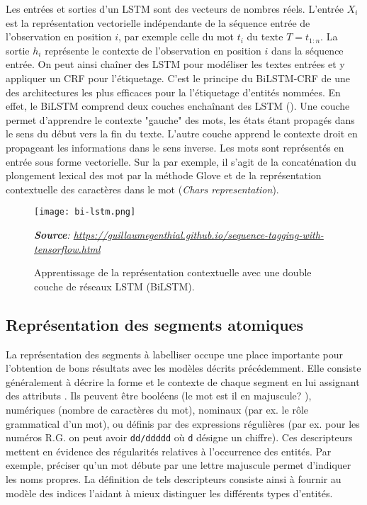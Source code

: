 Les entrées et sorties d'un LSTM sont des vecteurs de nombres réels. L'entrée $X_i$ est la représentation vectorielle indépendante de la séquence entrée de l'observation en position $i$, par exemple celle du mot $t_i$ du texte $T=t_{1:n}$. La sortie $h_i$ représente le contexte de l'observation en position $i$ dans la séquence entrée. On peut ainsi chaîner des LSTM pour modéliser les textes entrées et y appliquer un CRF pour l'étiquetage. C'est le principe du BiLSTM-CRF de \citet{lample2016nnner} une des architectures les plus efficaces pour la l'étiquetage d'entités nommées. En effet, le BiLSTM comprend deux couches enchaînant des LSTM (). Une couche permet d'apprendre le contexte "gauche" des mots, les états étant propagés dans le sens du début vers la fin du texte. L'autre couche apprend le contexte droit en propageant les informations dans le sens inverse. Les mots sont représentés en entrée sous forme vectorielle. Sur la  par exemple, il s'agit de la concaténation du plongement lexical des mot par la méthode Glove \citep{pennington2014glove} et de la représentation contextuelle des caractères dans le mot (\textit{Chars representation}).  

\begin{figure}[!htb]
	\centering \texttt{[image: bi-lstm.png]}
		
	\textit{\scriptsize{\textbf{Source}: \url{https://guillaumegenthial.github.io/sequence-tagging-with-tensorflow.html}}}
	\caption{Apprentissage de la représentation contextuelle avec une double couche de réseaux LSTM (BiLSTM).}\label{fig:structuration:bi-lstm}
\end{figure}


\subsection{Représentation des segments atomiques}

La représentation des segments à labelliser occupe une place importante pour l'obtention de bons résultats avec les modèles décrits précédemment. Elle consiste généralement à décrire la forme et le contexte de chaque segment en lui assignant des attributs \citep{nadeau2007nersurvey,sharnagat2014nersurvey}. Ils peuvent être booléens (\og le mot est il en majuscule? \fg{}), numériques (nombre de caractères du mot), nominaux (par ex. le rôle grammatical d'un mot), ou définis par des expressions régulières (par ex. pour les numéros R.G. on peut avoir \verb|dd/ddddd| où \verb|d| désigne un chiffre). Ces descripteurs mettent  en évidence des régularités relatives à l'occurrence des entités. Par exemple, préciser qu'un mot débute par une lettre majuscule permet d'indiquer les noms propres. La définition de tels descripteurs consiste ainsi à fournir au modèle des indices l'aidant à mieux distinguer les différents types d'entités. 

